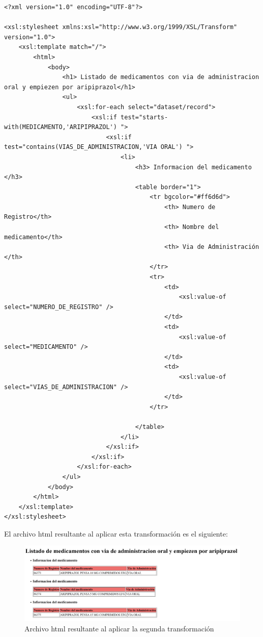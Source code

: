 \documentclass[../main.tex]{subfiles}
\begin{document}
\begin{lstlisting}
<?xml version="1.0" encoding="UTF-8"?>

<xsl:stylesheet xmlns:xsl="http://www.w3.org/1999/XSL/Transform" version="1.0">
    <xsl:template match="/">
        <html>
            <body>
                <h1> Listado de medicamentos con via de administracion oral y empiezen por aripiprazol</h1>
                <ul>
                    <xsl:for-each select="dataset/record">
                        <xsl:if test="starts-with(MEDICAMENTO,'ARIPIPRAZOL') ">
                            <xsl:if test="contains(VIAS_DE_ADMINISTRACION,'VIA ORAL') ">
                                <li>
                                    <h3> Informacion del medicamento </h3>
                                    <table border="1">
                                        <tr bgcolor="#ff6d6d">
                                            <th> Numero de Registro</th>
                                            <th> Nombre del medicamento</th>
                                            <th> Via de Administración </th>
                                        </tr>
                                        <tr>
                                            <td>
                                                <xsl:value-of select="NUMERO_DE_REGISTRO" />
                                            </td>
                                            <td>
                                                <xsl:value-of select="MEDICAMENTO" />
                                            </td>
                                            <td>
                                                <xsl:value-of select="VIAS_DE_ADMINISTRACION" />
                                            </td>
                                        </tr>

                                    </table>
                                </li>
                            </xsl:if>
                        </xsl:if>
                    </xsl:for-each>
                </ul>
            </body>
        </html>
    </xsl:template>
</xsl:stylesheet>
\end{lstlisting}
El archivo html resultante al aplicar esta transformación es el siguiente:

\begin{figure}[h]
    \centering
    \includegraphics[scale=0.3]{images/html_output2.png}
    \caption{Archivo html resultante al aplicar la segunda transformación}
    \label{fig:mesh1}
\end{figure}
\end{document}
